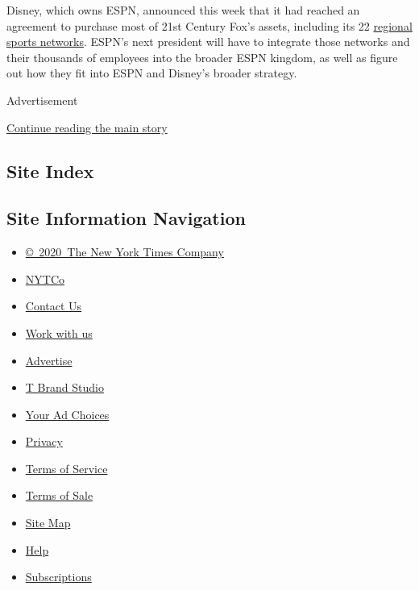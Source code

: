 Disney, which owns ESPN, announced this week that it had reached an
agreement to purchase most of 21st Century Fox's assets, including its
22
\href{https://www.nytimes3xbfgragh.onion/2017/12/15/sports/disney-fox-sports.html}{regional
sports networks}. ESPN's next president will have to integrate those
networks and their thousands of employees into the broader ESPN kingdom,
as well as figure out how they fit into ESPN and Disney's broader
strategy.

Advertisement

\protect\hyperlink{after-bottom}{Continue reading the main story}

\hypertarget{site-index}{%
\subsection{Site Index}\label{site-index}}

\hypertarget{site-information-navigation}{%
\subsection{Site Information
Navigation}\label{site-information-navigation}}

\begin{itemize}
\tightlist
\item
  \href{https://help.nytimes3xbfgragh.onion/hc/en-us/articles/115014792127-Copyright-notice}{©~2020~The
  New York Times Company}
\end{itemize}

\begin{itemize}
\tightlist
\item
  \href{https://www.nytco.com/}{NYTCo}
\item
  \href{https://help.nytimes3xbfgragh.onion/hc/en-us/articles/115015385887-Contact-Us}{Contact
  Us}
\item
  \href{https://www.nytco.com/careers/}{Work with us}
\item
  \href{https://nytmediakit.com/}{Advertise}
\item
  \href{http://www.tbrandstudio.com/}{T Brand Studio}
\item
  \href{https://www.nytimes3xbfgragh.onion/privacy/cookie-policy\#how-do-i-manage-trackers}{Your
  Ad Choices}
\item
  \href{https://www.nytimes3xbfgragh.onion/privacy}{Privacy}
\item
  \href{https://help.nytimes3xbfgragh.onion/hc/en-us/articles/115014893428-Terms-of-service}{Terms
  of Service}
\item
  \href{https://help.nytimes3xbfgragh.onion/hc/en-us/articles/115014893968-Terms-of-sale}{Terms
  of Sale}
\item
  \href{https://spiderbites.nytimes3xbfgragh.onion}{Site Map}
\item
  \href{https://help.nytimes3xbfgragh.onion/hc/en-us}{Help}
\item
  \href{https://www.nytimes3xbfgragh.onion/subscription?campaignId=37WXW}{Subscriptions}
\end{itemize}
